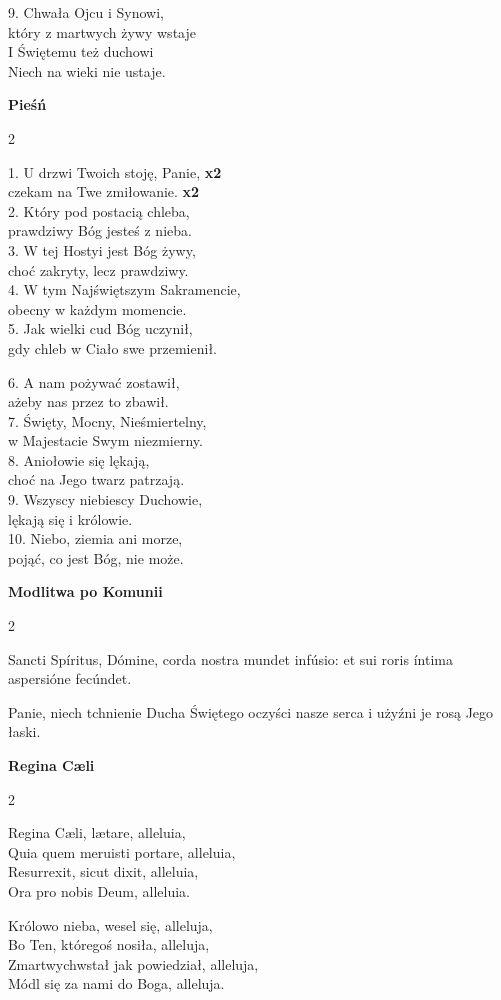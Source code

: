 \documentclass[10pt,a5paper]{book}
\newcommand{\oremus}[3]{\medskip\centerline{\textbf{#1}}\medskip
	\begin{sloppypar}
		\begin{paracol}{2}
			\setlength{\columnsep}{0em}
			\begin{leftcolumn}
				#2
			\end{leftcolumn}
			\begin{rightcolumn}
				#3
			\end{rightcolumn}
		\end{paracol}
	\end{sloppypar}}
\begin{document}
\begin{center}
	9. Chwała Ojcu i Synowi, \\
	który z martwych żywy wstaje\\
	I Świętemu też duchowi \\
	Niech na wieki nie ustaje. \\
\end{center}

\oremus{Pieśń}{
	1. U drzwi Twoich stoję, Panie, \textbf{x2}\\
	czekam na Twe zmiłowanie. \textbf{x2} \\

	2. Który pod postacią chleba, \\
	prawdziwy Bóg jesteś z nieba.\\

	3. W tej Hostyi jest Bóg żywy, \\
	choć zakryty, lecz prawdziwy.\\

	4. W tym Najświętszym Sakramencie, \\
	obecny w każdym momencie.\\

	5. Jak wielki cud Bóg uczynił, \\
	gdy chleb w Ciało swe przemienił.}{
	6. A nam pożywać zostawił, \\
	ażeby nas przez to zbawił.\\

	7. Święty, Mocny, Nieśmiertelny, \\
	w Majestacie Swym niezmierny.\\

	8. Aniołowie się lękają, \\
	choć na Jego twarz patrzają.\\

	9. Wszyscy niebiescy Duchowie, \\
	lękają się i królowie.\\

	10. Niebo, ziemia ani morze, \\
	pojąć, co jest Bóg, nie może.}

\newpage

\oremus{Modlitwa po Komunii}{Sancti Spíritus, Dómine, corda nostra mundet
	infúsio: et sui roris íntima aspersióne fecúndet.}{Panie, niech tchnienie
	Ducha Świętego oczyści nasze serca i użyźni je rosą Jego łaski.}


\oremus{Regina C\ae li}{
	Regina C\ae li, l\ae tare, alleluia, \\
	Quia quem meruisti portare, alleluia, \\
	Resurrexit, sicut dixit, alleluia, \\
	Ora pro nobis Deum, alleluia.}{
	Królowo nieba, wesel się, alleluja, \\
	Bo Ten, któregoś nosiła, alleluja, \\
	Zmartwychwstał jak powiedział, alleluja, \\
	Módl się za nami do Boga, alleluja.}
\end{document}
